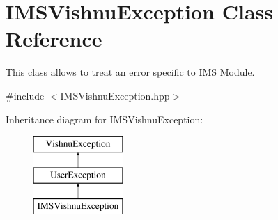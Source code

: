 \hypertarget{classIMSVishnuException}{
\section{IMSVishnuException Class Reference}
\label{classIMSVishnuException}
}


This class allows to treat an error specific to IMS Module.  




{\ttfamily \#include $<$IMSVishnuException.hpp$>$}

Inheritance diagram for IMSVishnuException:\begin{figure}[H]
\begin{center}
\leavevmode
\includegraphics[height=3.000000cm]{classIMSVishnuException}
\end{center}
\end{figure}
